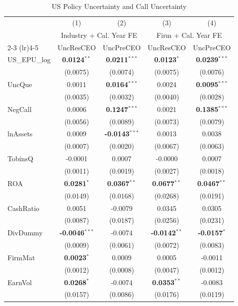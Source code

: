 \documentclass[11pt,a4paper]{article}
\begin{document}
\begin{table}[htbp]
\centering
\caption{US Policy Uncertainty and Call Uncertainty}
\label{tab:h24_us_epu}
\scriptsize
\begin{tabular}{lcccc}
\toprule
 & (1) & (2) & (3) & (4) \\
 & \multicolumn{2}{c}{Industry + Cal. Year FE} & \multicolumn{2}{c}{Firm + Cal. Year FE} \\
\cmidrule(lr){2-3} \cmidrule(lr){4-5}
 & UncResCEO & UncPreCEO & UncResCEO & UncPreCEO \\
\midrule
US\_EPU\_log & \textbf{0.0124}$^{**}$ & \textbf{0.0211}$^{***}$ & \textbf{0.0123}$^{*}$ & \textbf{0.0239}$^{***}$ \\
 & (0.0075) & (0.0074) & (0.0075) & (0.0076) \\
\midrule
UncQue & 0.0011 & \textbf{0.0164}$^{***}$ & 0.0024 & \textbf{0.0095}$^{***}$ \\
 & (0.0035) & (0.0032) & (0.0040) & (0.0028) \\
NegCall & 0.0006 & \textbf{0.1247}$^{***}$ & 0.0021 & \textbf{0.1385}$^{***}$ \\
 & (0.0056) & (0.0089) & (0.0073) & (0.0079) \\
lnAssets & 0.0009 & \textbf{-0.0143}$^{***}$ & 0.0013 & 0.0038 \\
 & (0.0007) & (0.0020) & (0.0067) & (0.0063) \\
TobinsQ & -0.0001 & 0.0007 & -0.0000 & 0.0007 \\
 & (0.0011) & (0.0019) & (0.0027) & (0.0018) \\
ROA & \textbf{0.0281}$^{*}$ & \textbf{0.0367}$^{**}$ & \textbf{0.0677}$^{**}$ & \textbf{0.0467}$^{**}$ \\
 & (0.0149) & (0.0168) & (0.0268) & (0.0191) \\
CashRatio & 0.0051 & -0.0079 & 0.0345 & 0.0305 \\
 & (0.0087) & (0.0187) & (0.0256) & (0.0231) \\
DivDummy & \textbf{-0.0046}$^{***}$ & -0.0074 & \textbf{-0.0142}$^{**}$ & \textbf{-0.0157}$^{*}$ \\
 & (0.0009) & (0.0061) & (0.0072) & (0.0083) \\
FirmMat & \textbf{0.0023}$^{*}$ & 0.0009 & 0.0005 & -0.0011 \\
 & (0.0012) & (0.0008) & (0.0047) & (0.0012) \\
EarnVol & \textbf{0.0268}$^{*}$ & -0.0074 & \textbf{0.0353}$^{**}$ & -0.0083 \\
 & (0.0157) & (0.0086) & (0.0176) & (0.0119) \\

\end{tabular}
\end{table}
\end{document}
